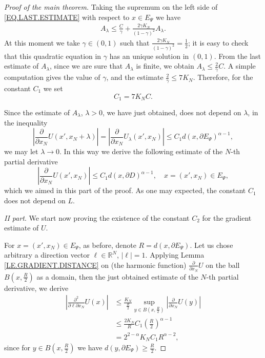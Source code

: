 \documentclass[10pt]{amsart}
\theoremstyle{definition}
\numberwithin{equation}{section}
\begin{document}
\begin{proof}[Proof of the main theorem]
Taking the  supremum on the left side  of   \eqref{EQ.LAST.ESTIMATE}   with  respect to  $x \in E_\Psi$ we have
\begin{equation*}\begin{split}
A_\lambda\le   \frac{C}\gamma + \frac {2\gamma K_N}{(1-\gamma)^2}  A_\lambda.
\end{split}\end{equation*}
At this moment we take  $\gamma \in (0,1)$ such that  $\frac {2\gamma K_N}{(1-\gamma)^2} = \frac 12$;      it is easy  to
check that  this quadratic  equation in $\gamma$  has  an  unique solution in  $(0,1)$.      From the last estimate   of
$A_\lambda$, since we are sure that   $A_\lambda$ is  finite, we obtain  $A_\lambda\le  \frac 2\gamma C$.       A simple
computation gives  the value  of  $\gamma$,  and  the estimate   $\frac 2\gamma\le  7  K_N$.        Therefore,  for  the
constant $C_1$ we set
\begin{equation*}
C_1 = 7 K_N C.
\end{equation*}

Since the estimate of  $A_\lambda$,  $\lambda>0$, we have just obtained, does not depend on $\lambda$, in the inequality
\begin{equation*}
\left| \frac {\partial} {\partial x_N} U (x',x_N+\lambda)\right|
= \left| \frac {\partial} {\partial x_N} U_\lambda(x',x_N) \right|
\le C_1 d(x,\partial E_\Psi)^{ \alpha-1},
\end{equation*}
we may let $\lambda\to 0$. In this way  we derive the following estimate  of the  $N$-th   partial  derivative
\begin{equation*}
\left| \frac {\partial} {\partial x_N} U(x',x_N) \right| \le C_1 d(x,\partial D)^{ \alpha-1},
\quad x=(x',x_N)\in E_\Psi,
\end{equation*}
which we aimed  in  this part of the proof.  As  one may expected,         the constant $C_1$   does not depend on  $L$.

\textit{II part}.  We   start now proving the  existence of the constant $C_2$     for  the gradient  estimate  of  $U$.

For $x=(x', x_N)\in E_\Psi$, as before, denote $R   =    d(x, \partial  E_\Psi)$.   Let us chose  arbitrary  a direction
vector $\ell\in \mathbb{R}^N$, $|\ell|=1$. Applying Lemma \ref{LE.GRADIENT.DISTANCE}  on         (the harmonic function)
$\frac{\partial}{\partial x_N} U$      on the ball  $B(x,\frac R 2)$ as a domain, then the just obtained estimate of the
$N$-th    partial derivative,    we  derive
\begin{equation*}\begin{split}
\left|\frac {\partial^2   } {\partial \ell \partial x_N}  U(x) \right|
&\le\frac {K_N}{\frac {R}2} \sup_{y \in {B}(x,\frac {R}2)}\left|\frac{\partial  }{\partial x_N} U(y)\right|
\\&\le \frac{2 K_N} {R}   C _1  \left(\frac{R}2\right)^{\alpha-1}
\\&= 2^{2-\alpha} K_N C_1 R^{\alpha-2},
\end{split}\end{equation*}
since for $y \in {B}(x,\frac {R}2)$ we have $d(y,\partial E_\Psi)\ge\frac {R}2$.


\end{proof}
\end{document}
